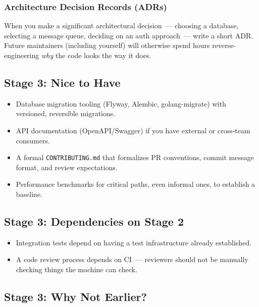 \subsubsection*{Architecture Decision Records (ADRs)}\label{writing-good-code:architecture-decision-records-adrs}

When you make a significant architectural decision~--- choosing a database, selecting a message queue, deciding on an auth approach~--- write a short ADR. Future maintainers (including yourself) will otherwise spend hours reverse-engineering \emph{why} the code looks the way it does.

\subsection*{Stage 3: Nice to Have}\label{writing-good-code:stage-3-nice-to-have}

\begin{itemize}
\tightlist
\item
  Database migration tooling (Flyway, Alembic, golang-migrate) with versioned, reversible migrations.
\item
  API documentation (OpenAPI/Swagger) if you have external or cross-team consumers.
\item
  A formal \texttt{CONTRIBUTING.md} that formalizes PR conventions, commit message format, and review expectations.
\item
  Performance benchmarks for critical paths, even informal ones, to establish a baseline.
\end{itemize}

\subsection*{Stage 3: Dependencies on Stage 2}\label{writing-good-code:stage-3-dependencies-on-stage-2}

\begin{itemize}
\tightlist
\item
  Integration tests depend on having a test infrastructure already established.
\item
  A code review process depends on CI~--- reviewers should not be manually checking things the machine can check.
\end{itemize}

\subsection*{Stage 3: Why Not Earlier?}\label{writing-good-code:stage-3-why-not-earlier}

